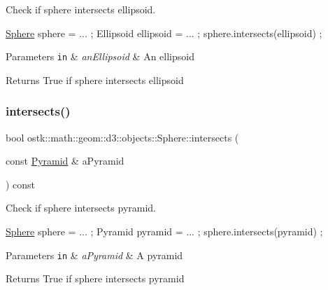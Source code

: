 Check if sphere intersects ellipsoid. 


\begin{DoxyCode}
\hyperlink{classostk_1_1math_1_1geom_1_1d3_1_1objects_1_1_sphere_a6920f72260a7b2c9ffc29283540e16c2}{Sphere} sphere = ... ;
Ellipsoid ellipsoid = ... ;
sphere.intersects(ellipsoid) ;
\end{DoxyCode}



\begin{DoxyParams}[1]{Parameters}
\mbox{\tt in}  & {\em an\+Ellipsoid} & An ellipsoid \\
\hline
\end{DoxyParams}
\begin{DoxyReturn}{Returns}
True if sphere intersects ellipsoid 
\end{DoxyReturn}
\mbox{\label{classostk_1_1math_1_1geom_1_1d3_1_1objects_1_1_sphere_af446f8d8e7dd3fe20a719fe07c2ec91c}} 
\subsubsection{\texorpdfstring{intersects()}{intersects()}\hspace{0.1cm}{\footnotesize\ttfamily [8/9]}}
{\footnotesize\ttfamily bool ostk\+::math\+::geom\+::d3\+::objects\+::\+Sphere\+::intersects (\begin{DoxyParamCaption}\item[{const \hyperlink{classostk_1_1math_1_1geom_1_1d3_1_1objects_1_1_pyramid}{Pyramid} \&}]{a\+Pyramid }\end{DoxyParamCaption}) const}



Check if sphere intersects pyramid. 


\begin{DoxyCode}
\hyperlink{classostk_1_1math_1_1geom_1_1d3_1_1objects_1_1_sphere_a6920f72260a7b2c9ffc29283540e16c2}{Sphere} sphere = ... ;
Pyramid pyramid = ... ;
sphere.intersects(pyramid) ;
\end{DoxyCode}



\begin{DoxyParams}[1]{Parameters}
\mbox{\tt in}  & {\em a\+Pyramid} & A pyramid \\
\hline
\end{DoxyParams}
\begin{DoxyReturn}{Returns}
True if sphere intersects pyramid 
\end{DoxyReturn}
\mbox{\label{classostk_1_1math_1_1geom_1_1d3_1_1objects_1_1_sphere_a376f9b54902cab434a6fda22fa40a64e}} 
